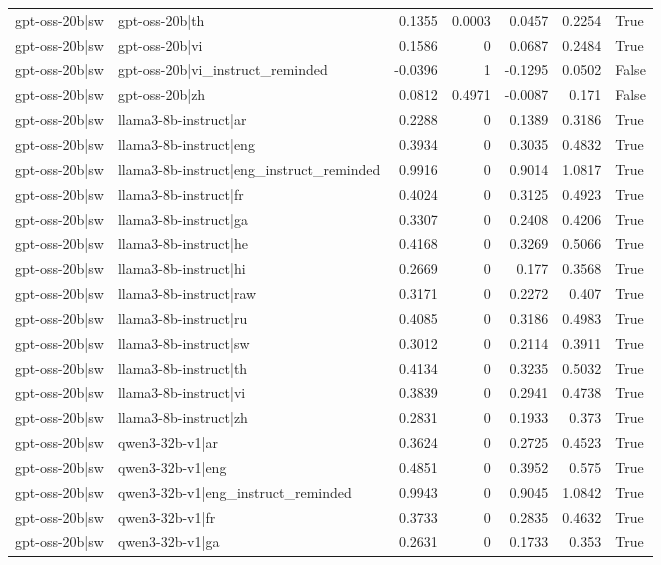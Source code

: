 \begin{table}
\begin{tabular}{l l r r r r l}
gpt-oss-20b|sw & gpt-oss-20b|th & 0.1355 & 0.0003 & 0.0457 & 0.2254 & True \\
gpt-oss-20b|sw & gpt-oss-20b|vi & 0.1586 & 0 & 0.0687 & 0.2484 & True \\
gpt-oss-20b|sw & gpt-oss-20b|vi_instruct_reminded & -0.0396 & 1 & -0.1295 & 0.0502 & False \\
gpt-oss-20b|sw & gpt-oss-20b|zh & 0.0812 & 0.4971 & -0.0087 & 0.171 & False \\
gpt-oss-20b|sw & llama3-8b-instruct|ar & 0.2288 & 0 & 0.1389 & 0.3186 & True \\
gpt-oss-20b|sw & llama3-8b-instruct|eng & 0.3934 & 0 & 0.3035 & 0.4832 & True \\
gpt-oss-20b|sw & llama3-8b-instruct|eng_instruct_reminded & 0.9916 & 0 & 0.9014 & 1.0817 & True \\
gpt-oss-20b|sw & llama3-8b-instruct|fr & 0.4024 & 0 & 0.3125 & 0.4923 & True \\
gpt-oss-20b|sw & llama3-8b-instruct|ga & 0.3307 & 0 & 0.2408 & 0.4206 & True \\
gpt-oss-20b|sw & llama3-8b-instruct|he & 0.4168 & 0 & 0.3269 & 0.5066 & True \\
gpt-oss-20b|sw & llama3-8b-instruct|hi & 0.2669 & 0 & 0.177 & 0.3568 & True \\
gpt-oss-20b|sw & llama3-8b-instruct|raw & 0.3171 & 0 & 0.2272 & 0.407 & True \\
gpt-oss-20b|sw & llama3-8b-instruct|ru & 0.4085 & 0 & 0.3186 & 0.4983 & True \\
gpt-oss-20b|sw & llama3-8b-instruct|sw & 0.3012 & 0 & 0.2114 & 0.3911 & True \\
gpt-oss-20b|sw & llama3-8b-instruct|th & 0.4134 & 0 & 0.3235 & 0.5032 & True \\
gpt-oss-20b|sw & llama3-8b-instruct|vi & 0.3839 & 0 & 0.2941 & 0.4738 & True \\
gpt-oss-20b|sw & llama3-8b-instruct|zh & 0.2831 & 0 & 0.1933 & 0.373 & True \\
gpt-oss-20b|sw & qwen3-32b-v1|ar & 0.3624 & 0 & 0.2725 & 0.4523 & True \\
gpt-oss-20b|sw & qwen3-32b-v1|eng & 0.4851 & 0 & 0.3952 & 0.575 & True \\
gpt-oss-20b|sw & qwen3-32b-v1|eng_instruct_reminded & 0.9943 & 0 & 0.9045 & 1.0842 & True \\
gpt-oss-20b|sw & qwen3-32b-v1|fr & 0.3733 & 0 & 0.2835 & 0.4632 & True \\
gpt-oss-20b|sw & qwen3-32b-v1|ga & 0.2631 & 0 & 0.1733 & 0.353 & True \\

\end{tabular}
\end{table}
